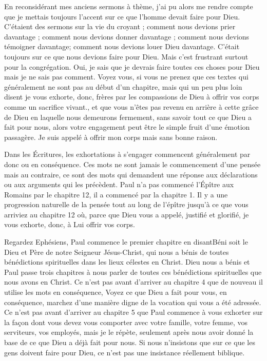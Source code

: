 En reconsidérant mes anciens sermons à thème, j'ai pu alors me rendre compte que je mettais toujours l’accent sur
ce que l’homme devait faire pour Dieu. C’étaient des sermons sur la vie du croyant ; comment nous devions prier
davantage ; comment nous devions donner davantage ; comment nous devions témoigner davantage; comment nous
devions louer Dieu davantage. C’était toujours sur ce que nous devions faire pour Dieu. Mais c’est frustrant surtout
pour la congrégation. Oui, je sais que je devrais faire toutes ces choses pour Dieu mais je ne sais pas comment.
Voyez vous, si vous ne prenez que ces textes qui généralement ne sont pas au début d’un chapitre, mais qui un peu
plus loin disent \og je vous exhorte, donc, frères par les compassions de Dieu à offrir vos corps comme un sacrifice
vivant.\fg{}, et que vous n’êtes pas revenu en arrière à cette grâce de Dieu en laquelle nous demeurons fermement, sans
savoir tout ce que Dieu a fait pour nous, alors votre engagement peut être le simple fruit d’une émotion passagère. Je
suis appelé à offrir mon corps mais sans bonne raison.

Dans les Écritures, les exhortations à s’engager commencent généralement par \og donc\fg{} ou \og en conséquence\fg{}. Ces
mots ne sont jamais le commencement d’une pensée mais au contraire, ce sont des mots qui demandent une réponse
aux déclarations ou aux arguments qui les précèdent.
Paul n’a pas commencé l’Épître aux Romains par le chapitre 12, il a commencé par la chapitre 1. Il y a une
progression naturelle de la pensée tout au long de l’épître jusqu’à ce que vous arriviez au chapitre 12 où, parce que
Dieu vous a appelé, justifié et glorifié, je vous exhorte, donc, à Lui offrir vos corps.

Regardez Ephésiens, Paul commence le premier chapitre en disant\frcolon\og Béni soit le Dieu et Père de notre Seigneur
Jésus-Christ, qui nous a bénis de toutes bénédictions spirituelles dans les lieux célestes en Christ.\fg{} Dieu nous a bénis
et Paul passe trois chapitres à nous parler de toutes ces bénédictions spirituelles que nous avons en Christ. Ce n’est
pas avant d’arriver au chapitre 4 que de nouveau il utilise les mots \og en conséquence\fg{}, \og Voyez ce que Dieu a fait pour
vous, en conséquence, marchez d’une manière digne de la vocation qui vous a été adressée.\fg{} Ce n’est pas avant
d’arriver au chapitre 5 que Paul commence à vous exhorter sur la façon dont vous devez vous comporter avec votre
famille, votre femme, vos serviteurs, vos employés, mais je le répète, seulement après nous avoir donné la base de ce
que Dieu a déjà fait pour nous. Si nous n’insistons que sur ce que les gens doivent faire pour Dieu, ce n’est pas une
insistance réellement biblique.

